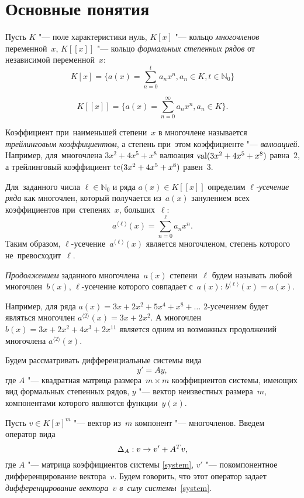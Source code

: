 \section{Основные понятия}

Пусть $K$ "--- поле характеристики нуль,
$K[x]$ "--- кольцо \emph{многочленов} переменной~$x$,
$K[[x]]$ "--- кольцо \emph{формальных степенных рядов} от независимой переменной~$x$:
\[
	K[x] = \{a(x) = \sum\limits_{n = 0}^t a_n x^n, a_n \in K, t \in \mathbb{N}_0\}
\]

\[
	K[[x]] = \{a(x) = \sum\limits_{n = 0}^\infty a_n x^n, a_n \in K\}.
\]

Коэффициент при~наименьшей степени~$x$ в многочлене называется \emph{трейлинговым коэффициентом},
а степень при~этом коэффициенте "--- \emph{валюацией}.
Например, для~многочлена $3x^2 + 4x^5 +x^8$ валюация $\mathop{\rm val}(3x^2 + 4x^5 +x^8)$ равна~$2$,
а трейлинговый коэффициент $\mathop{\rm tc}(3x^2 + 4x^5 +x^8)$ равен~$3$.

Для~заданного числа
$\ell \in \mathbb{N}_0$
и ряда
$a(x) \in K[[x]]$
определим \emph{$\ell$-усечение ряда} как многочлен, который получается из~$a(x)$
занулением всех коэффициентов при~степенях~$x$, больших~$\ell$:
\[
	a^{\langle \ell \rangle}(x) = \sum\limits_{n = 0}^{\ell} a_nx^n .
\]
Таким образом, $\ell$-усечение~$a^{\langle \ell \rangle}(x)$ является многочленом, степень которого не~превосходит~$\ell$.


\emph{Продолжением} заданного многочлена~$a(x)$ степени~$\ell$ будем называть любой многочлен~$b(x)$,
$\ell$-усечение которого совпадает с~$a(x)$: $b^{\langle \ell \rangle}(x) = a(x)$.

Например, для ряда $ a(x) = 3x + 2x^2 + 5x^4 + x^8 + \dots $ $2$-усечением будет являться многочлен $ a^{\langle 2 \rangle}(x) = 3x + 2x^2 $.
А многочлен $ b(x) = 3x + 2x^2 + 4x^3 + 2x^{11} $ является одним из возможных продолжений многочлена $a^{\langle 2 \rangle}(x)$.

\bigskip
Будем рассматривать дифференциальные системы вида
\begin{equation}
	y' = Ay,
	\label{system}
\end{equation}
где $A$ "--- квадратная матрица размера~$m \times m$ коэффициентов системы, имеющих вид формальных степенных рядов,
$y$ "--- вектор неизвестных размера~$m$, компонентами которого являются функции~$y(x)$.

Пусть $v \in K[x]^m$ "--- вектор из~$m$ компонент "--- многочленов. Введем~\cite{litVanDerPut} оператор вида
\begin{equation}
    \text{$ \Delta_A $}: v\rightarrow v' + A^T v,
    \label{differention}
\end{equation}
где $A$ "--- матрица коэффициентов системы \eqref{system}, $v'$ "--- покомпонентное дифференцирование вектора~$v$.
Будем говорить, что этот оператор задает \emph{дифференцирование вектора~$v$ в~силу системы}~\eqref{system}.

